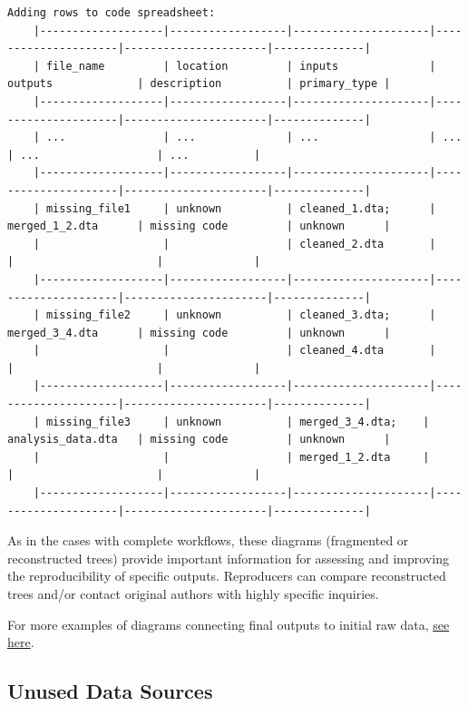 \documentclass[]{book}
\begin{document}
\begin{verbatim}
Adding rows to code spreadsheet:
    |-------------------|------------------|---------------------|---------------------|----------------------|--------------|
    | file_name         | location         | inputs              | outputs             | description          | primary_type |
    |-------------------|------------------|---------------------|---------------------|----------------------|--------------|
    | ...               | ...              | ...                 | ...                 | ...                  | ...          |
    |-------------------|------------------|---------------------|---------------------|----------------------|--------------|
    | missing_file1     | unknown          | cleaned_1.dta;      | merged_1_2.dta      | missing code         | unknown      |
    |                   |                  | cleaned_2.dta       |                     |                      |              |
    |-------------------|------------------|---------------------|---------------------|----------------------|--------------|
    | missing_file2     | unknown          | cleaned_3.dta;      | merged_3_4.dta      | missing code         | unknown      |
    |                   |                  | cleaned_4.dta       |                     |                      |              |                  
    |-------------------|------------------|---------------------|---------------------|----------------------|--------------|
    | missing_file3     | unknown          | merged_3_4.dta;    | analysis_data.dta   | missing code         | unknown      |
    |                   |                  | merged_1_2.dta     |                     |                      |              |                  
    |-------------------|------------------|---------------------|---------------------|----------------------|--------------|
\end{verbatim}

As in the cases with complete workflows, these diagrams (fragmented or reconstructed trees) provide important information for assessing and improving the reproducibility of specific outputs. Reproducers can compare reconstructed trees and/or contact original authors with highly specific inquiries.

For more examples of diagrams connecting final outputs to initial raw data, \protect\hyperlink{additional-diagrams}{see here}.

\hypertarget{unused-data-sources}{%
\subsection{Unused Data Sources}\label{unused-data-sources}}
\end{document}
